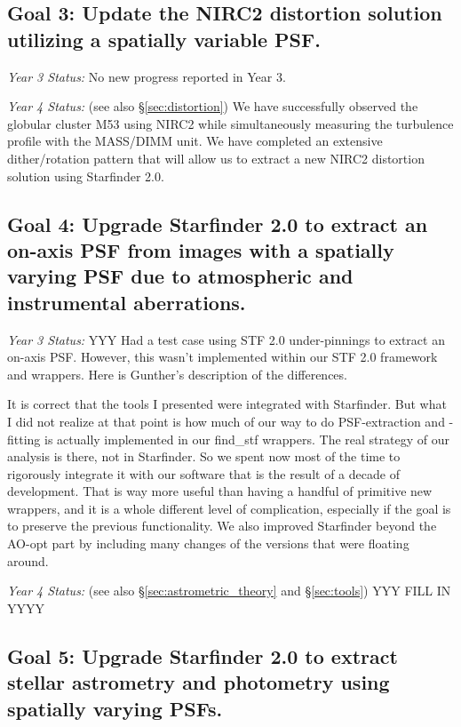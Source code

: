 \subsection{Goal 3: Update the NIRC2 distortion solution utilizing a spatially
  variable PSF.}

\noindent
\textit{Year 3 Status:}
No new progress reported in Year 3.

\noindent
\textit{Year 4 Status:} (see also \S\ref{sec:distortion})
We have successfully observed the globular cluster M53 using NIRC2
while simultaneously measuring the turbulence profile with the
MASS/DIMM unit. We have completed an extensive dither/rotation pattern
that will allow us to extract a new NIRC2 distortion solution using
Starfinder 2.0.


\subsection{Goal 4: Upgrade Starfinder 2.0 to extract an on-axis PSF from images with
  a spatially varying PSF due to atmospheric and instrumental aberrations.}

\noindent
\textit{Year 3 Status:} 
YYY Had a test case using STF 2.0 under-pinnings to extract an
on-axis PSF. However, this wasn't implemented within our STF 2.0
framework and wrappers. Here is Gunther's description of the
differences. 

It is correct that the tools I presented were integrated with
Starfinder. But what I did not realize at that point is how much of
our way to do PSF-extraction and -fitting is actually implemented in
our find\_stf wrappers. The real strategy of our analysis is there,
not in Starfinder. So we spent now most of the time to rigorously
integrate it with our software that is the result of a decade of
development. That is way more useful than having a handful of
primitive new wrappers, and it is a whole different level of
complication, especially if the goal is to preserve the previous
functionality. We also improved Starfinder beyond the AO-opt part by
including many changes of the versions that were floating around. 

\noindent
\textit{Year 4 Status:}
(see also \S\ref{sec:astrometric_theory} and \S\ref{sec:tools})
YYY FILL IN YYYY

\subsection{Goal 5: Upgrade Starfinder 2.0 to extract stellar astrometry and
  photometry using spatially varying PSFs.}

